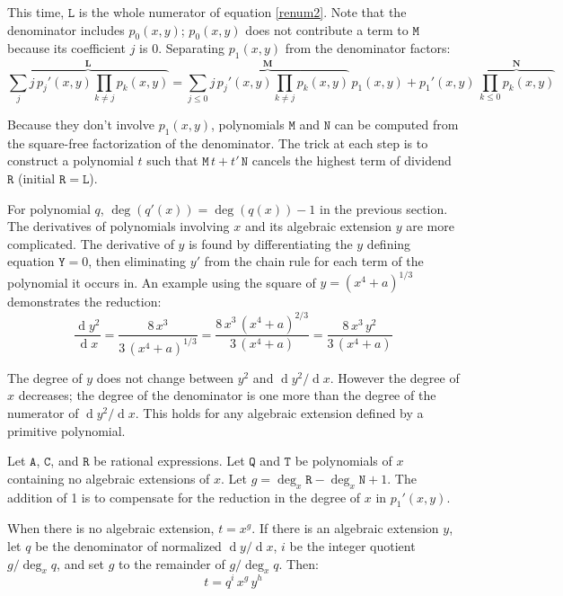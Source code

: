\documentclass[10pt,letterpaper]{article}
\theoremstyle{proclaim}
\DeclareMathOperator{\diff}{d}
\begin{document}
This time, $\mathtt{L}$ is the whole numerator of
equation \eqref{renum2}.  Note that the denominator includes
$p_0(x,y)$; $p_0(x,y)$ does not contribute a term to $\mathtt{M}$
because its coefficient $j$ is 0.  Separating $p_1(x,y)$ from the
denominator factors:
\begin{equation}
\overbrace{\sum_{j}j\,{p_j'}(x,y)\prod_{k\neq j} p_k(x,y)}^{\mathbf{L}}=
  \overbrace{\sum_{j\le0}j\,{p_j'}(x,y)\prod_{k\neq j}p_k(x,y)}^{\mathbf{M}}\,p_1(x,y)
  +{p_1'}(x,y)\,\overbrace{\prod_{k\le0}p_k(x,y)}^{\mathbf{N}}\label{p1(x,y)}
\end{equation}

Because they don't involve $p_1(x,y)$, polynomials $\mathtt{M}$ and
$\mathtt{N}$ can be computed from the square-free factorization of the
denominator.  The trick at each step is to construct a polynomial
$t$ such that $\mathtt{M}\,t+t'\,\mathtt{N}$ cancels the
highest term of dividend $\mathtt{R}$ (initial $\mathtt{R}=\mathtt{L}$).

For polynomial $q$, $\deg(q'(x))=\deg(q(x))-1$ in the previous
section.  The derivatives of polynomials involving $x$ and its
algebraic extension $y$ are more complicated.  The derivative of
$y$ is found by differentiating the $y$ defining equation
$\mathtt{Y}=0$, then eliminating $y'$ from the chain rule for each term
of the polynomial it occurs in.  An example using the square of
$y=(x^4+a)^{1/3}$ demonstrates the reduction:
\[
{\frac{\diff{y^2}}{ \diff{x}}}=
  {\frac{8\,x^3}{3\,(x^4+a)^{1/3}}}=
  {\frac{8\,x^3\,(x^4+a)^{2/3}}{3\,(x^4+a)}}=
  {\frac{8\,x^3\,y^2}{3\,(x^4+a)}}
\]

The degree of $y$ does not change between $y^2$ and $\diff{y^2}/\diff{x}$.
However the degree of $x$ decreases; the degree of the denominator is
one more than the degree of the numerator of $\diff{y^2}/\diff{x}$.  This holds
for any algebraic extension defined by a primitive polynomial.

Let $\mathtt{A}$, $\mathtt{C}$, and $\mathtt{R}$ be rational expressions.
Let $\mathtt{Q}$ and $\mathtt{T}$ be polynomials of $x$ containing no
algebraic extensions of $x$.  Let $g=\deg_x\mathtt{R}-\deg_x\mathtt{N}+1$.
The addition of 1 is to compensate for the reduction in the degree of
$x$ in $p_1'(x,y)$.

When there is no algebraic extension, $t=x^g$.  If there is an
algebraic extension $y$, let $q$ be the denominator of normalized
${\diff{y}/\diff{x}}$, $i$ be the integer quotient ${g/\deg_x{q}}$, and set
$g$ to the remainder of ${g/\deg_x{q}}$.  Then:
\[
t=q^i\,x^g\,y^h
\]
\end{document}
